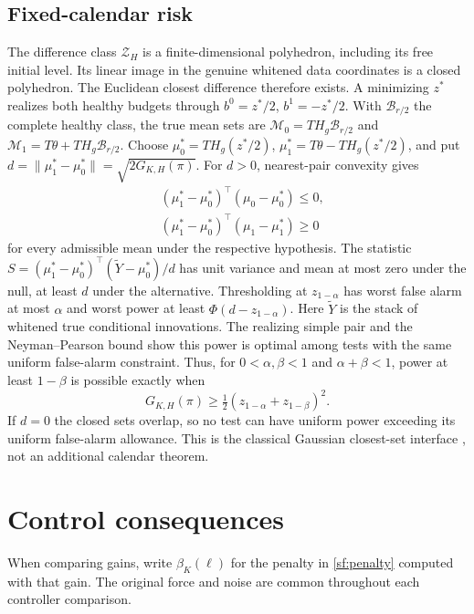 \documentclass[journal]{IEEEtran}
\begin{document}
\subsection{Fixed-calendar risk}\label{sf:risk}
The difference class $\mathcal Z_H$ is a finite-dimensional polyhedron, including
its free initial level. Its linear image in the genuine whitened data coordinates
is a closed polyhedron. The Euclidean closest difference therefore exists.
A minimizing $z^*$ realizes both healthy budgets through
$b^0=z^*/2$, $b^1=-z^*/2$. With $\mathcal B_{r/2}$ the complete healthy class,
the true mean sets are $\mathcal M_0=T H_g\mathcal B_{r/2}$ and
$\mathcal M_1=T \theta+T H_g\mathcal B_{r/2}$.
Choose $\mu_0^*=T H_g(z^*/2)$, $\mu_1^*=T \theta-T H_g(z^*/2)$, and put
$d=\|\mu_1^*-\mu_0^*\|=\sqrt{2G_{K,H}(\pi)}$.
For $d>0$, nearest-pair convexity gives
\[
\begin{aligned}
&(\mu_1^*-\mu_0^*)^\top(\mu_0-\mu_0^*)\le0,\\
&(\mu_1^*-\mu_0^*)^\top(\mu_1-\mu_1^*)\ge0
\end{aligned}
\]
for every admissible mean under the respective hypothesis.
The statistic
$S=(\mu_1^*-\mu_0^*)^\top(\widetilde Y-\mu_0^*)/d$
has unit variance and mean at most zero under the null, at least $d$ under
the alternative. Thresholding at $z_{1-\alpha}$ has worst false alarm
at most $\alpha$ and worst power at least
$\Phi(d-z_{1-\alpha})$.
Here $\widetilde Y$ is the stack of whitened true conditional innovations.
The realizing simple pair and the Neyman--Pearson bound show this power is
optimal among tests with the same uniform false-alarm constraint.
Thus, for $0<\alpha,\beta<1$ and $\alpha+\beta<1$, power at least
$1-\beta$ is possible exactly when
\[
G_{K,H}(\pi)\ge\tfrac12(z_{1-\alpha}+z_{1-\beta})^2.
\]
If $d=0$ the closed sets overlap, so no test can have uniform power exceeding
its uniform false-alarm allowance. This is the classical Gaussian closest-set
interface \cite{convex}, not an additional calendar theorem.
\section{Control consequences}\label{sf:control}
When comparing gains, write $\beta_K(\ell)$ for the penalty in
\eqref{sf:penalty} computed with that gain. The original force and noise
are common throughout each controller comparison.
\end{document}
